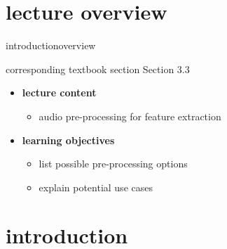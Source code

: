 


\subtitle{Module 3.3: Audio Pre-processing}


	

    \section[overview]{lecture overview}
        \begin{frame}{introduction}{overview}
            \begin{block}{corresponding textbook section}
                Section 3.3
            \end{block}

            \begin{itemize}
                \item   \textbf{lecture content}
                    \begin{itemize}
                        \item   audio pre-processing for feature extraction
                    \end{itemize}
                \bigskip
                \item<2->   \textbf{learning objectives}
                    \begin{itemize}
                        \item   list possible pre-processing options 
                        \item   explain potential use cases
                    \end{itemize}
            \end{itemize}
        \end{frame}

    \section[intro]{introduction}

